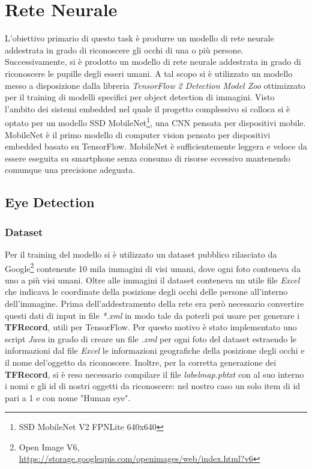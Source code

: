 \documentclass[11pt]{article}
\begin{document}
\newpage

\section{Rete Neurale}
L’obiettivo primario di questo task è produrre un modello di rete neurale addestrata in grado di riconoscere gli occhi di una o più persone. Successivamente, si è prodotto un modello di rete neurale addestrata in grado di riconoscere le pupille degli esseri umani.
\newline
A tal scopo si è utilizzato un modello messo a disposizione dalla libreria \textit{TensorFlow 2 Detection Model Zoo} ottimizzato per il training di modelli specifici per object detection di immagini. Visto l’ambito dei sistemi embedded nel quale il progetto complessivo si colloca si è optato per un modello SSD MobileNet\footnote{SSD MobileNet V2 FPNLite 640x640}, una CNN pensata per dispositivi mobile. MobileNet è il primo modello di computer vision pensato per dispositivi embedded basato su TensorFlow. MobileNet è sufficientemente leggera e veloce da essere eseguita su smartphone senza consumo di risorse eccessivo mantenendo comunque una precisione adeguata.

\subsection{Eye Detection}
\subsubsection{Dataset}
Per il training del modello si è utilizzato un dataset pubblico rilasciato da Google\footnote{Open Image V6, \url{https://storage.googleapis.com/openimages/web/index.html?v6}} contenente 10 mila immagini di visi umani, dove ogni foto conteneva da uno a più visi umani.
\newline
Oltre alle immagini il dataset conteneva un utile file \textit{Excel} che indicava le coordinate della posizione degli occhi delle persone all'interno dell'immagine.
\newline \newline
Prima dell'addestramento della rete era però necessario convertire questi dati di input in file \textit{*.xml} in modo tale da poterli poi usare per generare i \textbf{TFRecord}, utili per TensorFlow. Per questo motivo è stato implementato uno script \textit{Java} in grado di creare un file \textit{.xml} per ogni foto del dataset estraendo le informazioni dal file \textit{Excel} le informazioni geografiche della posizione degli occhi e il nome del'oggetto da riconoscere. 
Inoltre, per la corretta generazione dei \textbf{TFRecord}, si è reso necessario compilare il file \textit{labelmap.pbtxt} con al suo interno i nomi e gli id di nostri oggetti da riconoscere: nel nostro caso un solo item di id pari a 1 e con nome "Human eye".
\end{document}
